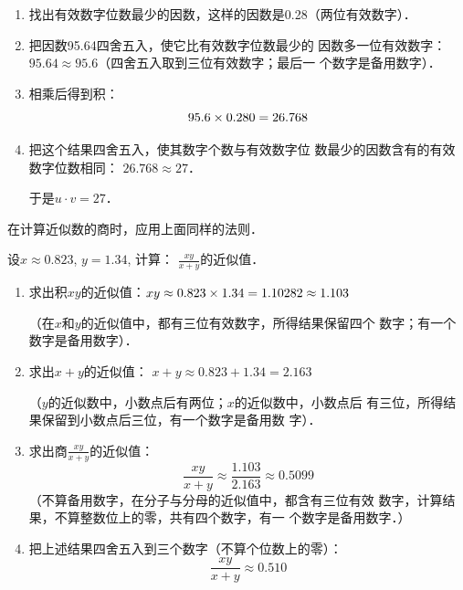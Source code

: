 \begin{solution}
\begin{enumerate}
    \item 找出有效数字位数最少的因数，这样的因数是0.28（两位有效数字）．
    \item 把因数95.64四舍五入，使它比有效数字位数最少的
因数多一位有效数字：$95.64\approx 95.6$（四舍五入取到三位有效数字；最后一
个数字是备用数字）．
\item 相乘后得到积：
\[95.6\times0.280=26.768\]
\item 把这个结果四舍五入，使其数字个数与有效数字位
数最少的因数含有的有效数字位数相同：
$26.768\approx 27$．

于是$u\cdot v=27$．
\end{enumerate}
\end{solution}

在计算近似数的商时，应用上面同样的法则．

\begin{example}
设$x\approx 0.823$, $y=1.34$, 计算：
$\frac{xy}{x+y}$的近似值．
\end{example}


\begin{solution}
\begin{enumerate}
    \item 求出积$xy$的近似值：$xy\approx 0.823\times1.34=1.10282\approx 1.103$
    
    （在$x$和$y$的近似值中，都有三位有效数字，所得结果保留四个
数字；有一个数字是备用数字）．
\item 求出$x+y$的近似值：
$x+y\approx 0.823+1.34=2.163$

（$y$的近似数中，小数点后有两位；$x$的近似数中，小数点后
有三位，所得结果保留到小数点后三位，有一个数字是备用数
字）．
\item 求出商$\frac{xy}{x+y}$的近似值：
\[\frac{xy}{x+y}\approx \frac{1.103}{2.163}\approx 0.5099\]
（不算备用数字，在分子与分母的近似值中，都含有三位有效
数字，计算结果，不算整数位上的零，共有四个数字，有一
个数字是备用数字．）

\item 把上述结果四舍五入到三个数字（不算个位数上的零）：
\[\frac{xy}{x+y}\approx 0.510\]
\end{enumerate}    
\end{solution}

